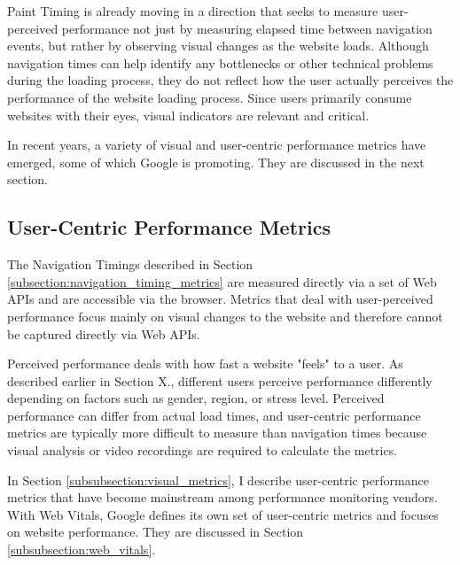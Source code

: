 
Paint Timing is already moving in a direction that seeks to measure user-perceived performance not just by measuring elapsed time between navigation events, but rather by observing visual changes as the website loads.
Although navigation times can help identify any bottlenecks or other technical problems during the loading process, they do not reflect how the user actually perceives the performance of the website loading process.
Since users primarily consume websites with their eyes, visual indicators are relevant and critical.

In recent years, a variety of visual and user-centric performance metrics have emerged, some of which Google is promoting.
They are discussed in the next section.


\subsection{User-Centric Performance Metrics} %
\label{subsection:user_centric_performance_metrics}


The Navigation Timings described in Section \ref{subsection:navigation_timing_metrics} are measured directly via a set of Web APIs and are accessible via the browser.
Metrics that deal with user-perceived performance focus mainly on visual changes to the website and therefore cannot be captured directly via Web APIs.

Perceived performance deals with how fast a website "feels" to a user.
As described earlier in Section X., different users perceive performance differently depending on factors such as gender, region, or stress level.
Perceived performance can differ from actual load times, and user-centric performance metrics are typically more difficult to measure than navigation times because visual analysis or video recordings are required to calculate the metrics. %

In Section \ref{subsubsection:visual_metrics}, I describe user-centric performance metrics that have become mainstream among performance monitoring vendors.
With Web Vitals, Google defines its own set of user-centric metrics and focuses on website performance.
They are discussed in Section \ref{subsubsection:web_vitals}.

